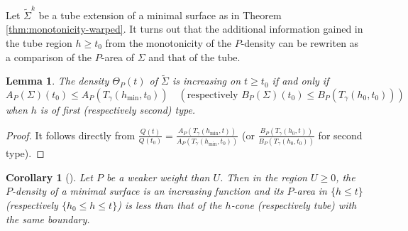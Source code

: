 \documentclass[11pt]{article}
\newtheorem{lemma}[theorem]{Lemma}
\newtheorem{corollary}[theorem]{Corollary}
\begin{document}
Let \(\tilde\Sigma^k\) be a tube extension of a minimal surface as in Theorem
\ref{thm:monotonicity-warped}. It turns out that the additional
information gained in the tube region \(h \geq t_0\) from the monotonicity of the \(P\)-density can be rewriten as a comparison of the
\(P\)-area of \(\Sigma\) and that of the tube.

\begin{lemma}
\label{lem:less-than-tube}
The density \(\Theta_P(t)\) of \(\tilde \Sigma\) is increasing on \(t \geq t_0\) if and
only if
\[
 A_P(\Sigma)(t_0) \leq A_P(T_\gamma(h_{\min}, t_0))\quad (\text{respectively }
B_P(\Sigma)(t_0)\leq B_P(T_\gamma(h_0, t_0)))
\]
when \(h\) is of first (respectively second) type.
\end{lemma}
\begin{proof}
It follows directly from \(\frac{Q(t)}{Q(t_0)}=\frac{A_P(T_\gamma(h_{\min},t))}{A_P(T_\gamma(h_{\min},t_0))}\) (or
\(\frac{B_P(T_\gamma(h_0,t))}{B_P(T_\gamma(h_0,t_0))}\) for second type).
\end{proof}

\begin{corollary}[]
\label{cor:less-than-tube}
Let \(P\) be a weaker weight than \(U\). Then in the region \(U\geq 0\), the \(P\)-density of a minimal surface is an increasing function and its \(P\)-area in \(\{h\leq t\}\) (respectively \(\{h_0\leq h\leq t\}\)) is less than
that of the \(h\)-cone (respectively tube) with the same boundary.
\end{corollary}
\end{document}

